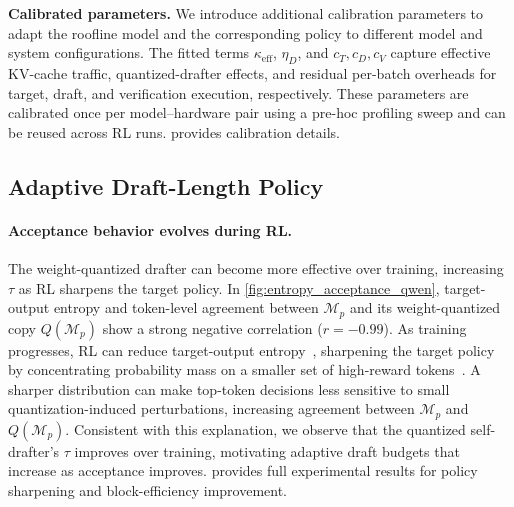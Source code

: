 \documentclass{llmxive}
\providecommand{\TargetDist}{p}
\providecommand{\Target}{\mathcal{M}_{\TargetDist}}
\providecommand{\TargetQuantized}{Q(\Target)}
\providecommand{\KVTrafficCoeff}{\kappa_{\mathrm{eff}}}
\providecommand{\DrafterQuantCoeff}{\eta_D}
\providecommand{\TargetOverhead}{c_T}
\providecommand{\DrafterOverhead}{c_D}
\providecommand{\VerifyOverhead}{c_V}
\begin{document}
\textbf{Calibrated parameters.}
We introduce additional calibration parameters to adapt the roofline model and the corresponding policy to different model and system configurations.
The fitted terms $\KVTrafficCoeff$, $\DrafterQuantCoeff$, and 
$\TargetOverhead,\DrafterOverhead,\VerifyOverhead$ capture effective KV-cache traffic, quantized-drafter effects, and residual per-batch overheads for target, draft, and verification execution, respectively.
These parameters are calibrated once per model--hardware pair using a pre-hoc profiling sweep and can be reused across RL runs.  provides calibration details.


\subsection{Adaptive Draft-Length Policy}
\label{subsec:adaptive-gamma}

\paragraph{Acceptance behavior evolves during RL.}
The weight-quantized drafter can become more effective over training, increasing $\tau$ as RL sharpens the target policy.
In \cref{fig:entropy_acceptance_qwen}, target-output entropy and token-level agreement between $\Target$ and its weight-quantized copy $\TargetQuantized$ show a strong negative correlation ($r=-0.99$).
As training progresses, RL can reduce target-output entropy~\citep{jin2025revisiting,cui2025entropy}, sharpening the target policy by concentrating probability mass on a smaller set of high-reward tokens~\citep{huang2024self,yang2025llm}.
A sharper distribution can make top-token decisions less sensitive to small quantization-induced perturbations, increasing agreement between $\Target$ and $\TargetQuantized$.
Consistent with this explanation, we observe that the quantized self-drafter's $\tau$ improves over training, motivating adaptive draft budgets that increase as acceptance improves.
 provides full experimental results for policy sharpening and block-efficiency improvement.
\end{document}
